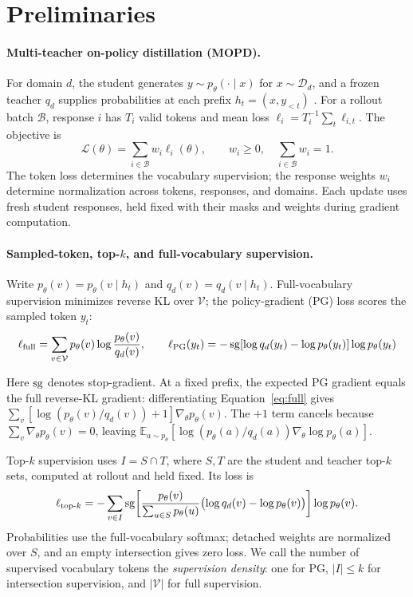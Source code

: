 \section{Preliminaries}
\label{sec:setting}

\paragraph{Multi-teacher on-policy distillation (MOPD).}
For domain $d$, the student generates $y\sim p_\theta(\cdot\mid x)$ for $x\sim\mathcal D_d$, and a frozen teacher $q_d$ supplies probabilities at each prefix $h_t=(x,y_{<t})$ \citep{gao2026openmopddiagnosingfixingcapability}. For a rollout batch $\mathcal B$, response $i$ has $T_i$ valid tokens and mean loss $\ell_i=T_i^{-1}\sum_t\ell_{i,t}$. The objective is
\begin{equation}
\mathcal L(\theta)=\sum_{i\in\mathcal B}w_i\ell_i(\theta),
\qquad w_i\geq0,\quad\sum_{i\in\mathcal B}w_i=1.
\label{eq:mopd}
\end{equation}
The token loss determines the vocabulary supervision; the response weights $w_i$ determine normalization across tokens, responses, and domains. Each update uses fresh student responses, held fixed with their masks and weights during gradient computation.

\paragraph{Sampled-token, top-$k$, and full-vocabulary supervision.}
Write $p_\theta(v)=p_\theta(v\mid h_t)$ and $q_d(v)=q_d(v\mid h_t)$. Full-vocabulary supervision minimizes reverse KL over $\mathcal V$; the policy-gradient (PG) loss scores the sampled token $y_t$:
\begin{equation}
\label{eq:full}
\ell_{\mathrm{full}}=\sum_{v\in\mathcal V}p_\theta(v)\log\frac{p_\theta(v)}{q_d(v)},\qquad
\ell_{\mathrm{PG}}(y_t)=-\operatorname{sg}[\log q_d(y_t)-\log p_\theta(y_t)]\log p_\theta(y_t)
\end{equation}

Here $\operatorname{sg}$ denotes stop-gradient. At a fixed prefix, the expected PG gradient equals the full reverse-KL gradient: differentiating Equation~\ref{eq:full} gives $\sum_v[\log(p_\theta(v)/q_d(v))+1]\nabla_\theta p_\theta(v)$. The $+1$ term cancels because $\sum_v\nabla_\theta p_\theta(v)=0$, leaving $\mathbb E_{a\sim p_\theta}[\log(p_\theta(a)/q_d(a))\nabla_\theta\log p_\theta(a)]$.

Top-$k$ supervision uses $I=S\cap T$, where $S,T$ are the student and teacher top-$k$ sets, computed at rollout and held fixed. Its loss is
\begin{equation}
\ell_{\mathrm{top}\text{-}k}=-\sum_{v\in I}\operatorname{sg}\!\left[
\frac{p_\theta(v)}{\sum_{u\in S}p_\theta(u)}
\bigl(\log q_d(v)-\log p_\theta(v)\bigr)\right]\log p_\theta(v).
\label{eq:topk}
\end{equation}
Probabilities use the full-vocabulary softmax; detached weights are normalized over $S$, and an empty intersection gives zero loss. We call the number of supervised vocabulary tokens the \emph{supervision density}: one for PG, $|I|\leq k$ for intersection supervision, and $|\mathcal V|$ for full supervision.

